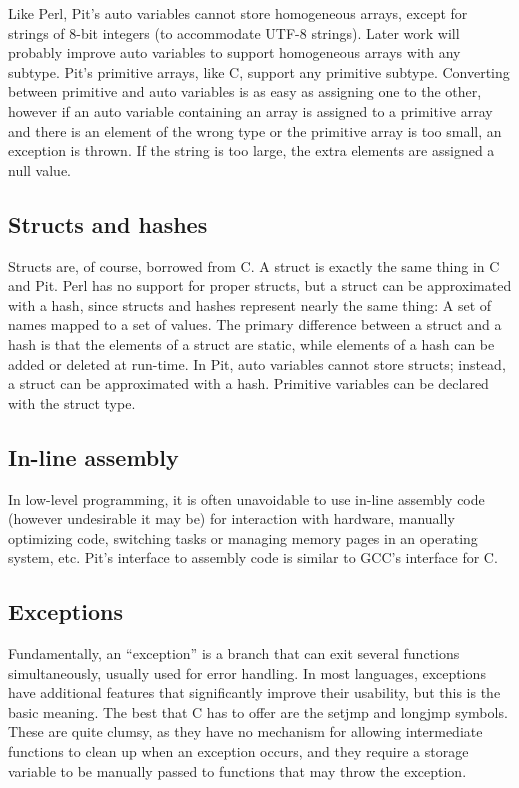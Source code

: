 Like Perl, Pit's auto variables cannot store homogeneous arrays, except for strings of 8-bit integers (to accommodate
UTF-8 strings).  Later work will probably improve auto variables to support homogeneous arrays with any subtype.  Pit's
primitive arrays, like C, support any primitive subtype.  Converting between primitive and auto variables is as easy
as assigning one to the other, however if an auto variable containing an array is assigned to a primitive array and
there is an element of the wrong type or the primitive array is too small, an exception is thrown.  If the string is
too large, the extra elements are assigned a null value.

\subsection{Structs and hashes}

Structs are, of course, borrowed from C.  A struct is exactly the same thing in C and Pit.  Perl has no support for
proper structs, but a struct can be approximated with a hash, since structs and hashes represent nearly the same thing:
A set of names mapped to a set of values.  The primary difference between a struct and a hash is that the elements of a
struct are static, while elements of a hash can be added or deleted at run-time.  In Pit, auto variables cannot store
structs; instead, a struct can be approximated with a hash.  Primitive variables can be declared with the struct type.

\subsection{In-line assembly}

In low-level programming, it is often unavoidable to use in-line assembly code (however undesirable it may be) for
interaction with hardware, manually optimizing code, switching tasks or managing memory pages in an operating system,
etc.  Pit's interface to assembly code is similar to GCC's interface for C.

\subsection{Exceptions}

Fundamentally, an ``exception'' is a branch that can exit several functions simultaneously, usually used for error
handling.  In most languages, exceptions have additional features that significantly improve their usability, but this
is the basic meaning.  The best that C has to offer are the setjmp and longjmp symbols.  These are quite clumsy, as
they have no mechanism for allowing intermediate functions to clean up when an exception occurs, and they require a
storage variable to be manually passed to functions that may throw the exception.

